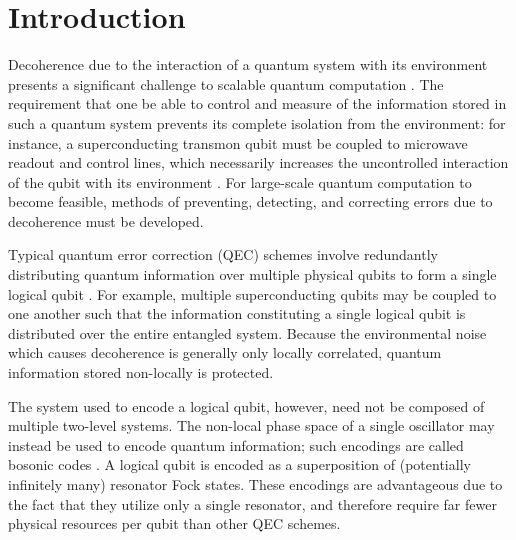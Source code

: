 \section{Introduction}

Decoherence due to the interaction of a quantum system with its environment presents a significant challenge to scalable quantum computation \cite{nielsen_chuang_2010}.
The requirement that one be able to control and measure of the information stored in such a quantum system prevents its complete isolation from the environment: for instance, a superconducting transmon qubit must be coupled to microwave readout and control lines, which necessarily increases the uncontrolled interaction of the qubit with its environment \cite{devoret_2013,wendin_2017}.
For large-scale quantum computation to become feasible, methods of preventing, detecting, and correcting errors due to decoherence must be developed.

Typical quantum error correction (QEC) schemes involve redundantly distributing quantum information over multiple physical qubits to form a single logical qubit \cite{nielsen_chuang_2010,wendin_2017,devoret_2013,raussendorf_2012}.
For example, multiple superconducting qubits may be coupled to one another such that the information constituting a single logical qubit is distributed over the entire entangled system.
Because the environmental noise which causes decoherence is generally only locally correlated, quantum information stored non-locally is protected.

The system used to encode a logical qubit, however, need not be composed of multiple two-level systems.
The non-local phase space of a single oscillator may instead be used to encode quantum information; such encodings are called bosonic codes \cite{cai_2021}.
A logical qubit is encoded as a superposition of (potentially infinitely many) resonator Fock states.
These encodings are advantageous due to the fact that they utilize only a single resonator, and therefore require far fewer physical resources per qubit than other QEC schemes.

